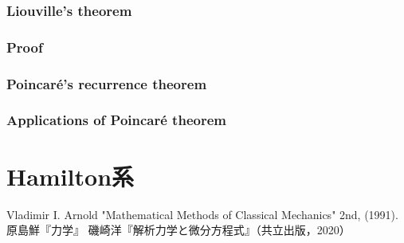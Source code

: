 \documentclass[uplatex, 12pt, dvipdfmx]{jsreport}
\begin{document}
\subsection{Liouville's theorem}

\subsection{Proof}

\subsection{Poincaré's recurrence theorem}

\subsection{Applications of Poincaré theorem}

\chapter{Hamilton系}

\begin{thebibliography}{99}
    Vladimir I. Arnold "Mathematical Methods of Classical Mechanics" 2nd, (1991).
    原島鮮『力学』
    磯崎洋『解析力学と微分方程式』（共立出版，2020）
\end{thebibliography}
\end{document}
